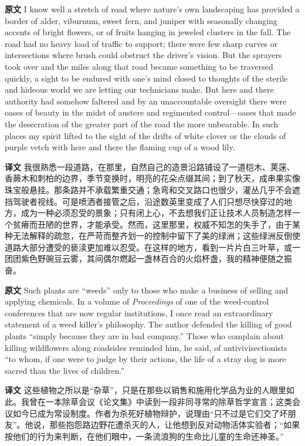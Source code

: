 \documentclass[UTF8,zihao=-4]{ctexart}
\begin{document}
\noindent\textbf{原文} I know well a stretch of road where nature's own landscaping has provided a border of alder, viburnum, sweet fern, and juniper with seasonally changing accents of bright flowers, or of fruits hanging in jeweled clusters in the fall. The road had no heavy load of traffic to support; there were few sharp curves or intersections where brush could obstruct the driver's vision. But the sprayers took over and the miles along that road became something to be traversed quickly, a sight to be endured with one's mind closed to thoughts of the sterile and hideous world we are letting our technicians make. But here and there authority had somehow faltered and by an unaccountable oversight there were oases of beauty in the midst of austere and regimented control---oases that made the desecration of the greater part of the road the more unbearable. In such places my spirit lifted to the sight of the drifts of white clover or the clouds of purple vetch with here and there the flaming cup of a wood lily.
\par
\noindent\textbf{译文} 我很熟悉一段道路，在那里，自然自己的造景沿路铺设了一道桤木、荚蒾、香蕨木和刺柏的边界，季节变换时，明亮的花朵点缀其间；到了秋天，成串果实像珠宝般悬挂。那条路并不承载繁重交通；急弯和交叉路口也很少，灌丛几乎不会遮挡驾驶者视线。可是喷洒者接管之后，沿途数英里变成了人们只想尽快穿过的地方，成为一种必须忍受的景象；只有闭上心，不去想我们正让技术人员制造怎样一个贫瘠而丑陋的世界，才能承受。然而，这里那里，权威不知怎的失手了，由于某种无法解释的疏忽，在严苛而整齐划一的控制中留下了美的绿洲；这些绿洲反倒使道路大部分遭受的亵渎更加难以忍受。在这样的地方，看到一片片白三叶草，或一团团紫色野豌豆云雾，其间偶尔燃起一盏林百合的火焰杯盏，我的精神便随之振奋。
\par\medskip

\noindent\textbf{原文} Such plants are ``weeds'' only to those who make a business of selling and applying chemicals. In a volume of \textit{Proceedings} of one of the weed-control conferences that are now regular institutions, I once read an extraordinary statement of a weed killer's philosophy. The author defended the killing of good plants ``simply because they are in bad company.'' Those who complain about killing wildflowers along roadsides reminded him, he said, of antivivisectionists ``to whom, if one were to judge by their actions, the life of a stray dog is more sacred than the lives of children.''
\par
\noindent\textbf{译文} 这些植物之所以是“杂草”，只是在那些以销售和施用化学品为业的人眼里如此。我曾在一本除草会议《论文集》中读到一段非同寻常的除草哲学宣言；这类会议如今已成为常设制度。作者为杀死好植物辩护，说理由“只不过是它们交了坏朋友”。他说，那些抱怨路边野花遭杀灭的人，让他想到反对动物活体实验者；“如果按他们的行为来判断，在他们眼中，一条流浪狗的生命比儿童的生命还神圣。”
\par\medskip
\end{document}
